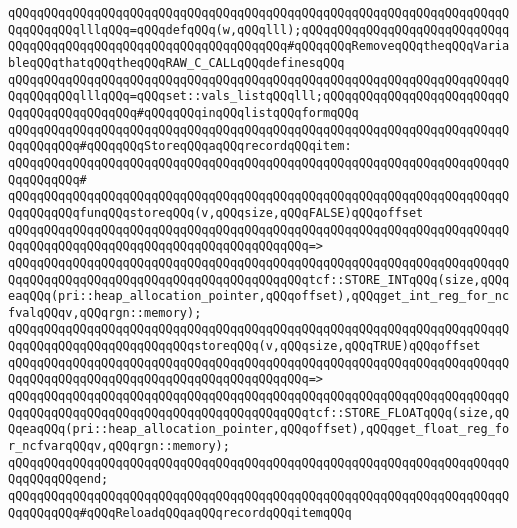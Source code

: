 \verb|qQQqqQQqqQQqqQQqqQQqqQQqqQQqqQQqqQQqqQQqqQQqqQQqqQQqqQQqqQQqqQQqqQQqqQQqqQQqqQQqlllqQQq=qQQqdefqQQq(w,qQQqlll);qQQqqQQqqQQqqQQqqQQqqQQqqQQqqQQqqQQqqQQqqQQqqQQqqQQqqQQqqQQqqQQqqQQq#qQQqqQQqRemoveqQQqtheqQQqVariableqQQqthatqQQqtheqQQqRAW_C_CALLqQQqdefinesqQQq|\newline
\verb|qQQqqQQqqQQqqQQqqQQqqQQqqQQqqQQqqQQqqQQqqQQqqQQqqQQqqQQqqQQqqQQqqQQqqQQqqQQqqQQqlllqQQq=qQQqset::vals_listqQQqlll;qQQqqQQqqQQqqQQqqQQqqQQqqQQqqQQqqQQqqQQqqQQq#qQQqqQQqinqQQqlistqQQqformqQQq|\newline
\newline
\newline
\verb|qQQqqQQqqQQqqQQqqQQqqQQqqQQqqQQqqQQqqQQqqQQqqQQqqQQqqQQqqQQqqQQqqQQqqQQqqQQqqQQq#qQQqqQQqStoreqQQqaqQQqrecordqQQqitem:|\newline
\verb|qQQqqQQqqQQqqQQqqQQqqQQqqQQqqQQqqQQqqQQqqQQqqQQqqQQqqQQqqQQqqQQqqQQqqQQqqQQqqQQq#|\newline
\verb|qQQqqQQqqQQqqQQqqQQqqQQqqQQqqQQqqQQqqQQqqQQqqQQqqQQqqQQqqQQqqQQqqQQqqQQqqQQqqQQqfunqQQqstoreqQQq(v,qQQqsize,qQQqFALSE)qQQqoffset|\newline
\verb|qQQqqQQqqQQqqQQqqQQqqQQqqQQqqQQqqQQqqQQqqQQqqQQqqQQqqQQqqQQqqQQqqQQqqQQqqQQqqQQqqQQqqQQqqQQqqQQqqQQqqQQqqQQqqQQq=>|\newline
\verb|qQQqqQQqqQQqqQQqqQQqqQQqqQQqqQQqqQQqqQQqqQQqqQQqqQQqqQQqqQQqqQQqqQQqqQQqqQQqqQQqqQQqqQQqqQQqqQQqqQQqqQQqqQQqqQQqtcf::STORE_INTqQQq(size,qQQqeaqQQq(pri::heap_allocation_pointer,qQQqoffset),qQQqget_int_reg_for_ncfvalqQQqv,qQQqrgn::memory);|\newline
\newline
\verb|qQQqqQQqqQQqqQQqqQQqqQQqqQQqqQQqqQQqqQQqqQQqqQQqqQQqqQQqqQQqqQQqqQQqqQQqqQQqqQQqqQQqqQQqqQQqqQQqstoreqQQq(v,qQQqsize,qQQqTRUE)qQQqoffset|\newline
\verb|qQQqqQQqqQQqqQQqqQQqqQQqqQQqqQQqqQQqqQQqqQQqqQQqqQQqqQQqqQQqqQQqqQQqqQQqqQQqqQQqqQQqqQQqqQQqqQQqqQQqqQQqqQQqqQQq=>|\newline
\verb|qQQqqQQqqQQqqQQqqQQqqQQqqQQqqQQqqQQqqQQqqQQqqQQqqQQqqQQqqQQqqQQqqQQqqQQqqQQqqQQqqQQqqQQqqQQqqQQqqQQqqQQqqQQqqQQqtcf::STORE_FLOATqQQq(size,qQQqeaqQQq(pri::heap_allocation_pointer,qQQqoffset),qQQqget_float_reg_for_ncfvarqQQqv,qQQqrgn::memory);|\newline
\verb|qQQqqQQqqQQqqQQqqQQqqQQqqQQqqQQqqQQqqQQqqQQqqQQqqQQqqQQqqQQqqQQqqQQqqQQqqQQqqQQqend;|\newline
\newline
\newline
\verb|qQQqqQQqqQQqqQQqqQQqqQQqqQQqqQQqqQQqqQQqqQQqqQQqqQQqqQQqqQQqqQQqqQQqqQQqqQQqqQQq#qQQqReloadqQQqaqQQqrecordqQQqitemqQQq|\newline
